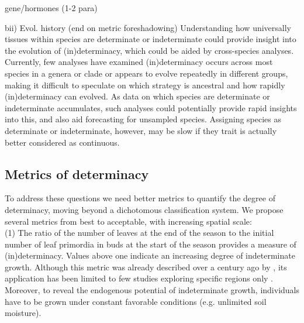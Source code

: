 \documentclass{article}
\begin{document}
	

	gene/hormones (1-2 para) %
	
	bii) Evol. history (end on metric foreshadowing) %
	Understanding how universally tissues within species are determinate or indeterminate could provide insight into the evolution of (in)determinacy, which could be aided by cross-species analyses. Currently, few analyses have examined (in)determinacy 
	occurs across most species in a genera or clade or appears to evolve repeatedly in different groups, making it difficult to speculate on which strategy is ancestral and how rapidly (in)determinacy can evolved. As data on which species are determinate or indeterminate accumulates, such analyses could potentially provide rapid insights into this, and also aid forecasting for unsampled species. Assigning species as determinate or indeterminate, however, may be slow if they trait is actually better considered as continuous. %
	
	\subsection*{Metrics of determinacy}
	To address these questions we need better metrics to quantify the degree of determinacy, moving beyond a dichotomous classification system. We propose several metrics from best to acceptable, with increasing spatial scale: \\
	
	(1) The ratio of the number of leaves at the end of the season to the initial number of leaf primordia in buds at the start of the season provides a measure of (in)determinacy. Values above one indicate an increasing degree of indeterminate growth. Although this metric was already described over a century ago by \citet{mooreStudyWinterBuds1909}, its application has been limited to few studies exploring specific regions only \citep{damascosBudCompositionBranching2005, kikuzawaLeafSurvivalWoody1983, guedonRelativeExtentsPreformation2006}. Moreover, to reveal the endogenous potential of indeterminate growth, individuals have to be grown under constant favorable conditions (e.g. unlimited soil moisture).\\
	
\end{document}
